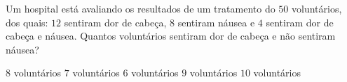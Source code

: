 Um hospital está avaliando os resultados de um tratamento do $50$ voluntários, dos quais: $12$ sentiram dor de cabeça, $8$ sentiram náusea e $4$ sentiram dor de cabeça e náusea. Quantos voluntários sentiram dor de cabeça e não sentiram náusea?

$8$ voluntários
$7$ voluntários
$6$ voluntários
$9$ voluntários
$10$ voluntários





